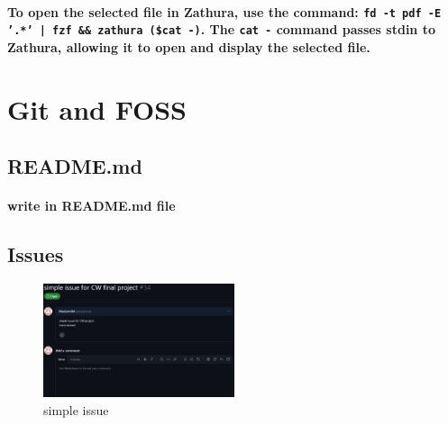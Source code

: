 \documentclass[11pt]{article}
\begin{document}
\paragraph{\small To open the selected file in Zathura, use the command: \texttt{fd -t pdf -E '.*' | fzf \&\& zathura (\$cat -)}. The \texttt{cat -} command passes stdin to Zathura, allowing it to open and display the selected file.}

\section{Git and FOSS}
\subsection{README.md}
\paragraph{write in README.md file}

\subsection{Issues}
\begin{figure}[h]
    \centering
    \includegraphics[width=0.5\textwidth]{issue.png}
    \caption{simple issue}
\end{figure}    
\end{document}
